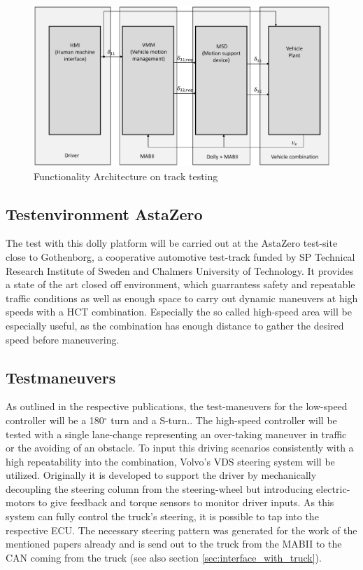 \documentclass[ExampleMasters.tex]{subfiles}
\begin{document}
\begin{figure}[!htb]
	\centering
	\includegraphics[width=0.5\linewidth]{figures/functionality_architecture_track}
	
	\caption{Functionality Architecture on track testing}
	\label{fig:funct_architecture_track}
\end{figure} 

\subsection{Testenvironment AstaZero}


The test with this dolly platform will be carried out at the AstaZero test-site close to Gothenborg, a cooperative automotive test-track funded by SP Technical Research Institute of Sweden and Chalmers University of Technology. It provides a state of the art closed off environment, which guarrantess safety and repeatable traffic conditions as well as enough space to carry out dynamic maneuvers at high speeds with a \gls{HCT} combination. Especially the so called high-speed area will be especially useful, as the combination has enough distance to gather the desired speed before maneuvering.

\subsection{Testmaneuvers}

As outlined in the respective publications, the test-maneuvers for the low-speed controller will be a 180$^{\circ}$ turn and a S-turn.\cite{Low-speed_paper}. The high-speed controller will be tested with a single lane-change representing an over-taking maneuver in traffic or the avoiding of an obstacle.\cite{High-speed_paper} To input this driving scenarios consistently with a high repeatability into the combination, Volvo's \gls{VDS} steering system will be utilized. Originally it is developed to support the driver by mechanically decoupling the steering column from the steering-wheel but introducing electric-motors to give feedback and torque sensors to monitor driver inputs. As this system can fully control the truck's steering, it is possible to tap into the respective \gls{ECU}. The necessary steering pattern was generated for the work of the mentioned papers already and is send out to the truck from the \gls{MABII} to the \gls{CAN} coming from the truck (see also section \ref{sec:interface_with_truck}).
\end{document}
